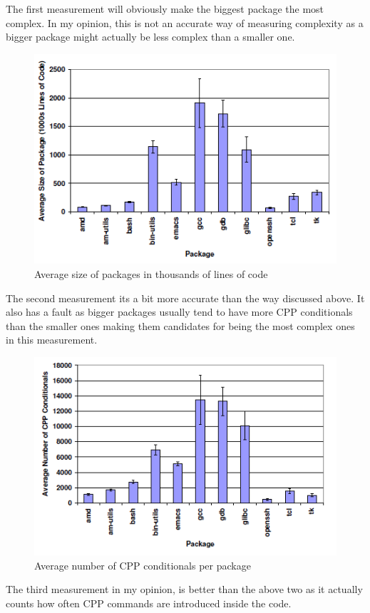\documentclass[11pt]{article}
\begin{document}
The first measurement will obviously make the biggest package the most complex. In my opinion, this is not an accurate way of measuring complexity as a bigger package might actually be less complex than a smaller one.

\begin{figure}[!htb]
\centering
  \includegraphics[width=.7\linewidth]{images/measure1}
  \caption{Average size of packages in thousands of lines of
code \cite{zadok2002}}
  \label{fig:measure1}
\end{figure}
\FloatBarrier
The second measurement its a bit more accurate than the way discussed above. It also has a fault as bigger packages usually tend to have more CPP conditionals than the smaller ones making them candidates for being the most complex ones in this measurement.

\begin{figure}[!htb]
\centering
  \includegraphics[width=.7\linewidth]{images/measure2}
  \caption{Average number of CPP conditionals per package \cite{zadok2002}}
  \label{fig:measure2}
\end{figure}
\FloatBarrier

The third measurement in my opinion, is better than the above two as it actually counts how often CPP commands are introduced inside the code.
\end{document}
